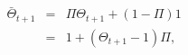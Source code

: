 \begin{eqnarray}
  \bar{\Theta}_{t+1} & = & \Pi \Theta_{t+1} + (1-\Pi)1
\\   & = & 1 + (\Theta_{t+1}-1)\Pi ,  \label{eq:barTheta}
\end{eqnarray}
